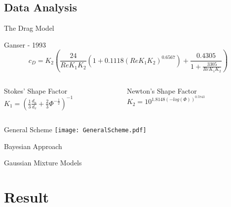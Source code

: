 \documentclass{beamer}
\begin{document}
\subsection{Data Analysis}
	\begin{frame}{The Drag Model}
		\begin{block}{Ganser - 1993}
			\begin{equation*}
				c_D = K_2 \left( \frac{24}{Re K_1 K_2} (1 + 0.1118 (Re K_1 K_2)^{0.6567}) + \frac{0.4305}{1 + \frac{3305}{Re K_1 K_2}}\right) 
			\end{equation*}
			\vfill
		\end{block}
		
		
		\begin{columns}[T]
			\begin{column}{.4\textwidth}
				\begin{block}{Stokes' Shape Factor}
					\centering
					$ K_1 = \left( \frac{1}{3} \frac{d_n}{d_v} + \frac{2}{3} \Phi^{-\frac{1}{2}} \right)^{-1} $
				\end{block}
			\end{column}
			
			\begin{column}{.4\textwidth}
				\begin{block}{Newton's Shape Factor}
					\centering
					$ K_2 = 10^{1.8148 (-log(\Phi))^{0.5743}} $
				\end{block}
			\end{column}
		\end{columns}
	\end{frame}

	\begin{frame}{General Scheme}
		\centering
		\texttt{[image: GeneralScheme.pdf]}
	\end{frame}

	\begin{frame}{Bayesian Approach}
		
	\end{frame}
	
	\begin{frame}{Gaussian Mixture Models}
		
	\end{frame}
	
\section{Result}
\end{document}
